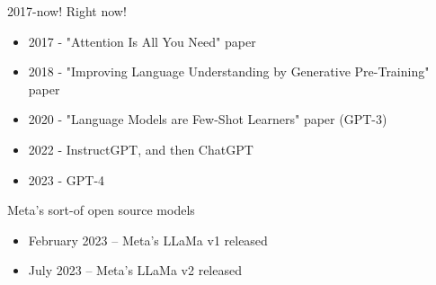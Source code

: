\documentclass{beamer}
\begin{document}

\begin{frame}{2017-now! Right now!}
	\begin{itemize}
		\item 2017 - "Attention Is All You Need" paper
		\pause
		\item 2018 - "Improving Language Understanding by Generative Pre-Training" paper
		\pause 
		\item 2020 - "Language Models are Few-Shot Learners" paper (GPT-3)
		\pause
		\item 2022 - InstructGPT, and then ChatGPT
		\pause
		\item 2023 - GPT-4
	\end{itemize}
\end{frame}

\begin{frame}[plain]
\end{frame}


\begin{frame}Meta's sort-of open source models
	\begin{itemize}
		\item February 2023 -- Meta's LLaMa v1 released
		\pause
		\item July 2023 -- Meta's LLaMa v2 released
	\end{itemize}
\end{frame}
\end{document}
